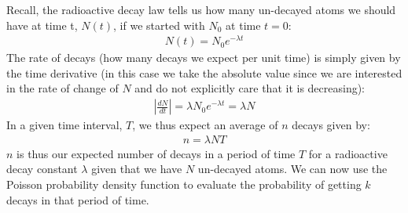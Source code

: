 Recall, the radioactive decay law tells us how many un-decayed atoms we should have at time t, $N(t)$, if we started with $N_0$ at time $t=0$:
\begin{align}
N(t)=N_0e^{-\lambda t}
\end{align}
The rate of decays (how many decays we expect per unit time) is simply given by the time derivative (in this case we take the absolute value since we are interested in the rate of change of $N$ and do not explicitly care that it is decreasing):
\begin{align}
\left | \frac{dN}{dt} \right |=\lambda N_0e^{-\lambda t}=\lambda N
\end{align}
In a given time interval, $T$, we thus expect an average of $n$ decays given by:
\begin{align}
n=\lambda N T
\end{align}
$n$ is thus our expected number of decays in a period of time $T$ for a radioactive decay constant $\lambda$ given that we have $N$ un-decayed atoms. We can now use the Poisson probability density function to evaluate the probability of getting $k$ decays in that period of time. 



